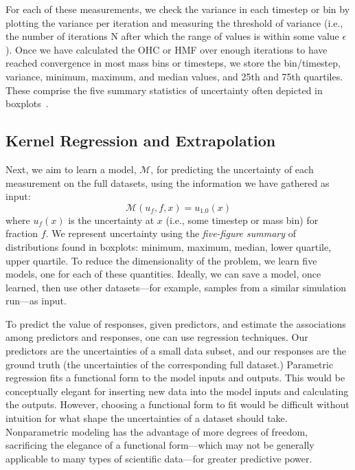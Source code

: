For each of these measurements, we check the variance in each timestep or bin by plotting the variance per iteration and measuring the threshold of variance (i.e., the number of iterations N after which the range of values is within some value $\epsilon$). Once we have calculated the OHC or HMF over enough iterations to have reached convergence in most mass bins or timesteps, we store the bin/timestep, variance, minimum, maximum, and median values, and 25th and 75th quartiles. These comprise the five summary statistics of uncertainty often depicted in boxplots~\cite{brodlie2012review}. 


\subsection{Kernel Regression and Extrapolation} 
\label{methods}
Next, we aim to learn a model, $\mathcal{M}$, for predicting the uncertainty of each measurement on the full datasets, using the information we have gathered as input:
\begin{equation}
\mathcal{M}(u_f, f, x) = u_{1.0}(x)
\end{equation}
where $u_f(x)$ is the uncertainty at $x$ (i.e., some timestep or mass bin) for fraction $f$. We represent uncertainty using the \textit{five-figure summary} of distributions found in boxplots: minimum, maximum, median, lower quartile, upper quartile. To reduce the dimensionality of the problem, we learn five models, one for each of these quantities. Ideally, we can save a model, once learned, then use other datasets---for example, samples from a similar simulation run---as input. 

	To predict the value of responses, given predictors, and estimate the associations among predictors and responses, one can use regression techniques. Our predictors are the uncertainties of a small data subset, and our responses are the ground truth (the uncertainties of the corresponding full dataset.) Parametric regression fits a functional form to the model inputs and outputs. This would be conceptually elegant for inserting new data into the model inputs and calculating the outputs. However, choosing a functional form to fit would be difficult without intuition for what shape the uncertainties of a dataset should take. Nonparametric modeling has the advantage of more degrees of freedom, sacrificing the elegance of a functional form---which may not be generally applicable to many types of scientific data---for greater predictive power. 

